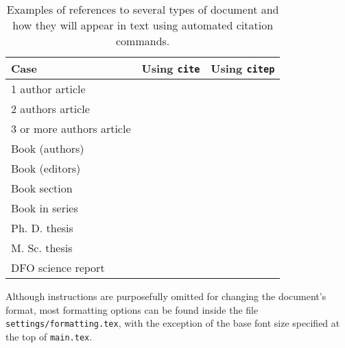 \begin{table}[ht]
    \centering
    \caption{Examples of references to several types of document and how they will appear in text using automated citation commands.}
    \label{tab:ref}
    \begin{tabular}{lll}
    \hline\hline
        Case & Using \texttt{cite} & Using \texttt{citep} \\ \hline
        1 author article & \cite{Doe2020} & \citep{Doe2020} \\
        2 authors article & \cite{Doe2019} & \citep{Doe2019} \\
        3 or more authors article & \cite{Doe2018} & \citep{Doe2018} \\
        Book (authors) & \cite{Doe2017} & \citep{Doe2017} \\
        Book (editors) & \cite{Doe2016} & \citep{Doe2016} \\
        Book section & \cite{Doe2015} & \citep{Doe2015} \\
        Book in series & \cite{Doe2014} & \citep{Doe2014} \\
        Ph. D. thesis & \cite{Doe2000} & \citep{Doe2000}\\
        M. Sc. thesis & \cite{Brown2005} & \citep{Brown2005}\\
        DFO science report & & \\ \hline
    \end{tabular}

\end{table}




Although instructions are purposefully omitted for changing the document's format, most formatting options can be found inside the file \texttt{settings/formatting.tex}, with the exception of the base font size specified at the top of \texttt{main.tex}.

\clearpage